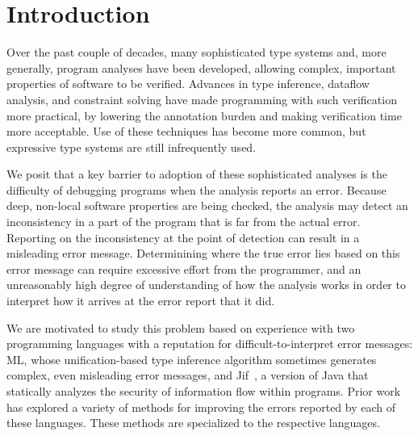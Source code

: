\begin{abstract}

\end{abstract}

\section{Introduction}

Over the past couple of decades, many sophisticated type systems and,
more generally, program analyses have been developed, allowing
complex, important properties of software to be verified. Advances in
type inference, dataflow analysis, and constraint solving have made
programming with such verification more practical, by lowering the
annotation burden and making verification time more acceptable.  Use
of these techniques has become more common, but expressive type
systems are still infrequently used.

We posit that a key barrier to adoption of these sophisticated
analyses is the difficulty of debugging programs when the analysis
reports an error. Because deep, non-local software properties are
being checked, the analysis may detect an inconsistency in a part of
the program that is far from the actual error. Reporting on the
inconsistency at the point of detection can result in a misleading
error message. Determinining where the true error lies based on this
error message can require excessive effort from the programmer, and an
unreasonably high degree of understanding of how the analysis works
in order to interpret how it arrives at the error report that it did.

We are motivated to study this problem based on experience with two
programming languages with a reputation for difficult-to-interpret
error messages: ML, whose unification-based type
inference algorithm sometimes generates complex, even misleading error
messages, and Jif~\cite{jif}, a version of Java that statically
analyzes the security of information flow within programs. Prior work
has explored a variety of methods for improving the errors reported by
each of these languages. These methods are specialized to the
respective languages.


